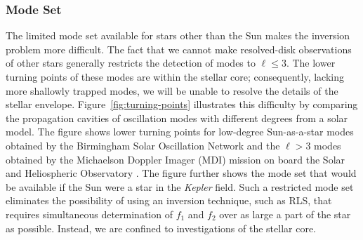 \subsubsection*{Mode Set}
The limited mode set available for stars other than the Sun makes the inversion problem more difficult. 
The fact that we cannot make resolved-disk observations of other stars generally restricts the detection of modes to ${\ell \le 3}$. 
The lower turning points of these modes are within the stellar core; consequently, lacking more shallowly trapped modes, we will be unable to resolve the details of the stellar envelope. 
Figure~\ref{fig:turning-points} illustrates this difficulty by comparing the propagation cavities of oscillation modes with different degrees from a solar model. 
The figure shows lower turning points for low-degree Sun-as-a-star modes obtained by the Birmingham Solar Oscillation Network \citep[BiSON;][]{2014MNRAS.439.2025D} and the ${\ell > 3}$ modes obtained by the Michaelson Doppler Imager (MDI) mission on board the Solar and Heliospheric Observatory \citep[SOHO,][]{1997SoPh..175..287R}. 
The figure further shows the mode set that would be available if the Sun were a star in the {\it Kepler} field. 
Such a restricted mode set eliminates the possibility of using an inversion technique, such as RLS, that requires simultaneous determination of $f_1$ and $f_2$ over as large a part of the star as possible. 
Instead, we are confined to investigations of the stellar core. 


